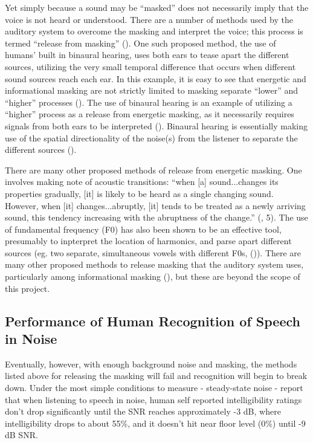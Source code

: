 \documentclass[dissertation,copyright]{uathesis}
\begin{document}
Yet simply because a sound may be ``masked'' does not necessarily imply that the voice is not heard or understood.  There are a number of methods used by the auditory system to overcome the masking and interpret the voice; this process is termed ``release from masking'' (\cite{middlebrooks:17}).  One such proposed method, the use of humans' built in binaural hearing, uses both ears to tease apart the different sources, utilizing the very small temporal difference that occurs when different sound sources reach each ear.  
In this example, it is easy to see that energetic and informational masking are not strictly limited to masking separate ``lower'' and ``higher'' processes (\cite{durlach:06}).
The use of binaural hearing is an example of utilizing a ``higher'' process as a release from energetic masking, as it necessarily requires signals from both ears to be interpreted (\cite{hirsh:48}). Binaural hearing is essentially making use of the spatial directionality of the noise(s) from the listener to separate the different sources (\cite{bregman:94}).

There are many other proposed methods of release from energetic masking. One involves making note of acoustic transitions: ``when [a] sound...changes its properties gradually, [it] is likely to be heard as a single changing sound.  However, when [it] changes...abruptly, [it] tends to be treated as a newly arriving sound, this tendency increasing with the abruptness of the change.'' (\cite{bregman:94}, 5).  The use of fundamental frequency (F0) has also been shown to be an effective tool, presumably to inpterpret the location of harmonics, and parse apart different sources (eg. two separate, simultaneous vowels with different F0s, (\cite{bird:97})). There are many other proposed methods to release masking that the auditory system uses, particularly among informational masking (\cite{middlebrooks:17}), but these are beyond the scope of this project.


\subsection{Performance of Human Recognition of Speech in Noise}

Eventually, however, with enough background noise and masking, the methods listed above for releasing the masking will fail and recognition will begin to break down.  Under the most simple conditions to measure - steady-state noise - \cite{ding:13} report that when listening to speech in noise, human self reported intelligibility ratings don't drop significantly until the SNR reaches approximately -3 dB, where intelligibility drops to about 55\%, and it doesn't hit near floor level (0\%) until -9 dB SNR.
\end{document}
